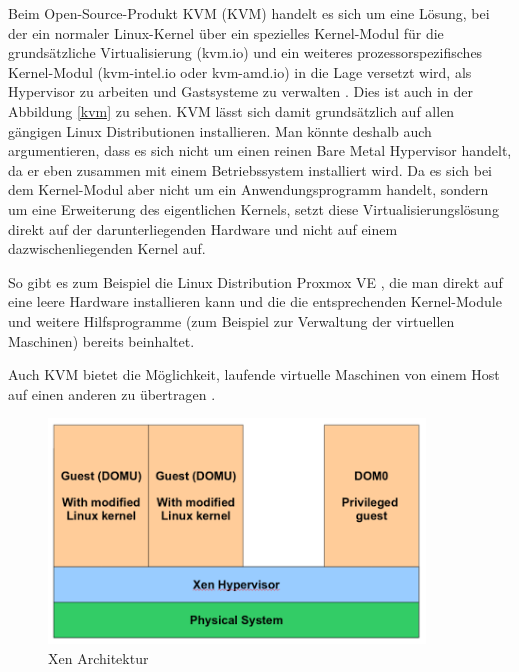 Beim Open-Source-Produkt KVM (\acl{KVM}) handelt es sich um eine Lösung, bei der ein normaler Linux-Kernel über ein spezielles Kernel-Modul für die grundsätzliche Virtualisierung (kvm.io) und ein weiteres prozessorspezifisches Kernel-Modul (kvm-intel.io oder kvm-amd.io) in die Lage versetzt wird, als Hypervisor zu arbeiten und Gastsysteme zu verwalten \citep[Vgl.][S. 225 - 227]{KivKam07}. Dies ist auch in der Abbildung \ref{kvm} zu sehen. KVM lässt sich damit grundsätzlich auf allen gängigen Linux Distributionen installieren. Man könnte deshalb auch argumentieren, dass es sich nicht um einen reinen Bare Metal Hypervisor handelt, da er eben zusammen mit einem Betriebssystem installiert wird. Da es sich bei dem Kernel-Modul aber nicht um ein Anwendungsprogramm handelt, sondern um eine Erweiterung des eigentlichen Kernels, setzt diese Virtualisierungslösung direkt auf der darunterliegenden Hardware und nicht auf einem dazwischenliegenden Kernel auf.

So gibt es zum Beispiel die Linux Distribution Proxmox VE \citep[Vgl.][]{Proxmox14}, die man direkt auf eine leere Hardware installieren kann und die die entsprechenden Kernel-Module und weitere Hilfsprogramme (zum Beispiel zur Verwaltung der virtuellen Maschinen) bereits beinhaltet.

Auch KVM bietet die Möglichkeit, laufende virtuelle Maschinen von einem Host auf einen anderen zu übertragen \citep[Vgl.][]{kvm:001}.

\begin{figure}[!ht]
  \begin{center}
    \includegraphics[width=10cm]{bilder/xen.png}
    \caption{Xen Architektur \citep{kvm:002}}
    \label{xen}
  \end{center}
\end{figure}

